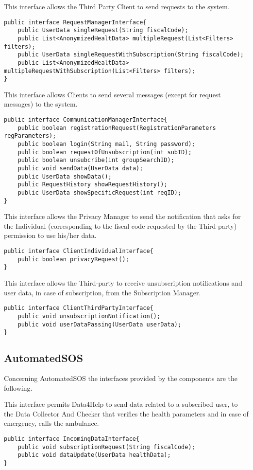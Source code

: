 This interface allows the Third Party Client to send requests   to the system.
\begin{lstlisting}
public interface RequestManagerInterface{
	public UserData singleRequest(String fiscalCode);
	public List<AnonymizedHealtData> multipleRequest(List<Filters> filters);
	public UserData singleRequestWithSubscription(String fiscalCode);
	public List<AnonymizedHealtData> multipleRequestWithSubscription(List<Filters> filters);
}
\end{lstlisting}

This interface allows Clients to send several messages (except for request messages) to the system.
\begin{lstlisting}
public interface CommunicationManagerInterface{	
	public boolean registrationRequest(RegistrationParameters regParameters);
	public boolean login(String mail, String password);
	public boolean requestOfUnsubscription(int subID);
	public boolean unsubcribe(int groupSearchID);
	public void sendData(UserData data);
	public UserData showData();
	public RequestHistory showRequestHistory();
	public UserData showSpecificRequest(int reqID);
}
\end{lstlisting}

This interface allows the Privacy Manager to send the notification that asks for the Individual (corresponding to the fiscal code requested by the Third-party) permission to use his/her data.
\begin{lstlisting}
public interface ClientIndividualInterface{
	public boolean privacyRequest();
}
\end{lstlisting}

This interface allows the Third-party to receive unsubscription notifications and user data, in case of subscription, from the Subscription Manager.
\begin{lstlisting}
public interface ClientThirdPartyInterface{	
	public void unsubscriptionNotification();
	public void userDataPassing(UserData userData);
}
\end{lstlisting}

\subsection{AutomatedSOS}

Concerning AutomatedSOS the interfaces provided by the components are the following.

This interface permits Data4Help to send data related to a subscribed user, to the Data Collector And Checker that verifies the health parameters and in case of emergency, calls the ambulance.
\begin{lstlisting}
public interface IncomingDataInterface{
	public void subscriptionRequest(String fiscalCode);
	public void dataUpdate(UserData healthData);
}
\end{lstlisting}

